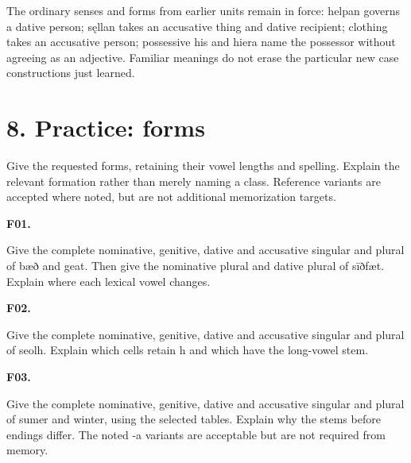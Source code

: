 The ordinary senses and forms from earlier units remain in force: helpan governs a dative person; sęllan takes an accusative thing and dative recipient; clothing takes an accusative person; possessive his and hiera name the possessor without agreeing as an adjective. Familiar meanings do not erase the particular new case constructions just learned.

\section*{8. Practice: forms}

Give the requested forms, retaining their vowel lengths and spelling. Explain the relevant formation rather than merely naming a class. Reference variants are accepted where noted, but are not additional memorization targets.

\par\begin{minipage}{\linewidth}\raggedright
\textbf{F01.}

Give the complete nominative, genitive, dative and accusative singular and plural of bæð and geat. Then give the nominative plural and dative plural of sīðfæt. Explain where each lexical vowel changes.

\end{minipage}\par\addvspace{4pt}

\par\begin{minipage}{\linewidth}\raggedright
\textbf{F02.}

Give the complete nominative, genitive, dative and accusative singular and plural of seolh. Explain which cells retain h and which have the long-vowel stem.

\end{minipage}\par\addvspace{4pt}

\par\begin{minipage}{\linewidth}\raggedright
\textbf{F03.}

Give the complete nominative, genitive, dative and accusative singular and plural of sumer and winter, using the selected tables. Explain why the stems before endings differ. The noted -a variants are acceptable but are not required from memory.

\end{minipage}\par\addvspace{4pt}

